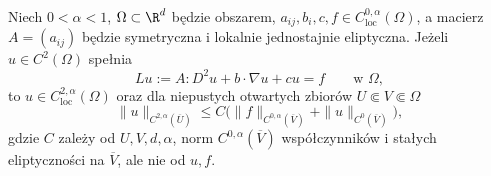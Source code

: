 \begin{twierdzenie}
\label{thm:pde16-schauder-variable}
Niech $0<\alpha<1$, $\Omega\subset\R^d$ będzie obszarem,
$a_{ij},b_i,c,f\in C^{0,\alpha}_{\mathrm{loc}}(\Omega)$,
a macierz $A=(a_{ij})$ będzie symetryczna i lokalnie
jednostajnie eliptyczna. Jeżeli $u\in C^2(\Omega)$ spełnia
\[
 Lu:=A:D^2u+b\cdot\nabla u+cu=f
 \qquad\text{w }\Omega,
\]
to $u\in C^{2,\alpha}_{\mathrm{loc}}(\Omega)$ oraz dla
niepustych otwartych zbiorów $U\Subset V\Subset\Omega$
\[
 \|u\|_{C^{2,\alpha}(\overline U)}
 \le C\bigl(\|f\|_{C^{0,\alpha}(\overline V)}
 +\|u\|_{C^0(\overline V)}\bigr),
\]
gdzie $C$ zależy od $U,V,d,\alpha$, norm
$C^{0,\alpha}(\overline V)$ współczynników i stałych
eliptyczności na $\overline V$, ale nie od $u,f$.
\end{twierdzenie}
